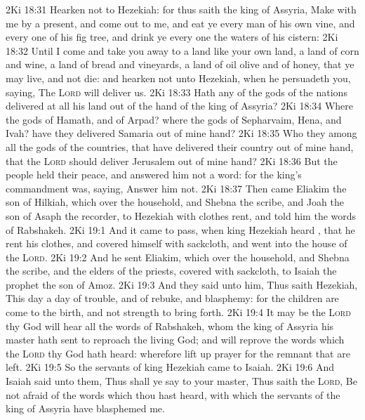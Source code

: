 \vs 2Ki 18:31 Hearken not to Hezekiah: for thus saith the king of Assyria, Make  with me by a present, and come out to me, and  eat ye every man of his own vine, and every one of his fig tree, and drink ye every one the waters of his cistern:
\vs 2Ki 18:32 Until I come and take you away to a land like your own land, a land of corn and wine, a land of bread and vineyards, a land of oil olive and of honey, that ye may live, and not die: and hearken not unto Hezekiah, when he persuadeth you, saying, The \textsc{Lord} will deliver us.
\vs 2Ki 18:33 Hath any of the gods of the nations delivered at all his land out of the hand of the king of Assyria?
\vs 2Ki 18:34 Where  the gods of Hamath, and of Arpad? where  the gods of Sepharvaim, Hena, and Ivah? have they delivered Samaria out of mine hand?
\vs 2Ki 18:35 Who  they among all the gods of the countries, that have delivered their country out of mine hand, that the \textsc{Lord} should deliver Jerusalem out of mine hand?
\vs 2Ki 18:36 But the people held their peace, and answered him not a word: for the king's commandment was, saying, Answer him not.
\vs 2Ki 18:37 Then came Eliakim the son of Hilkiah, which  over the household, and Shebna the scribe, and Joah the son of Asaph the recorder, to Hezekiah with  clothes rent, and told him the words of Rabshakeh.
\vs 2Ki 19:1 And it came to pass, when king Hezekiah heard , that he rent his clothes, and covered himself with sackcloth, and went into the house of the \textsc{Lord}.
\vs 2Ki 19:2 And he sent Eliakim, which  over the household, and Shebna the scribe, and the elders of the priests, covered with sackcloth, to Isaiah the prophet the son of Amoz.
\vs 2Ki 19:3 And they said unto him, Thus saith Hezekiah, This day  a day of trouble, and of rebuke, and blasphemy: for the children are come to the birth, and  not strength to bring forth.
\vs 2Ki 19:4 It may be the \textsc{Lord} thy God will hear all the words of Rabshakeh, whom the king of Assyria his master hath sent to reproach the living God; and will reprove the words which the \textsc{Lord} thy God hath heard: wherefore lift up  prayer for the remnant that are left.
\vs 2Ki 19:5 So the servants of king Hezekiah came to Isaiah.
\vs 2Ki 19:6 And Isaiah said unto them, Thus shall ye say to your master, Thus saith the \textsc{Lord}, Be not afraid of the words which thou hast heard, with which the servants of the king of Assyria have blasphemed me.
